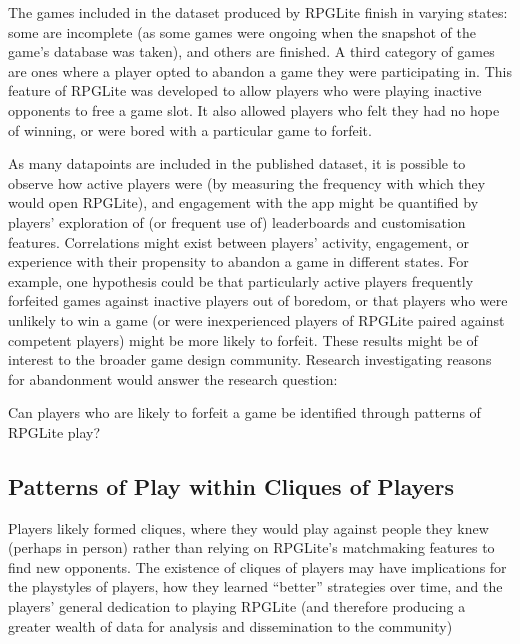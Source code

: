 The games included in the dataset produced by RPGLite finish in varying states:
some are incomplete (as some games were ongoing when the snapshot of the game's
database was taken), and others are finished. A third category of games are ones
where a player opted to abandon a game they were participating in. This feature
of RPGLite was developed to allow players who were playing inactive opponents to
free a game slot. It also allowed players who felt they had no hope of winning,
or were bored with a particular game to forfeit.

As many datapoints are included in the published dataset, it is possible to
observe how active players were (by measuring the frequency with which they
would open RPGLite), and engagement with the app might be quantified by players'
exploration of (or frequent use of) leaderboards and customisation features.
Correlations might exist between players' activity, engagement, or experience
with their propensity to abandon a game in different states. For example, one
hypothesis could be that particularly active players frequently forfeited games
against inactive players out of boredom, or that players who were unlikely to
win a game (or were inexperienced players of RPGLite paired against competent
players) might be more likely to forfeit. These results might be of interest to
the broader game design community. Research investigating reasons for
abandonment would answer the research question:

\begin{researchquestion}
    Can players who are likely to forfeit a game be identified through patterns
    of RPGLite play?
\end{researchquestion}
















    
\subsection{Patterns of Play within Cliques of Players}
Players likely formed cliques, where they would play against people they knew
(perhaps in person) rather than relying on RPGLite's matchmaking features to
find new opponents. The existence of cliques of players may have implications
for the playstyles of players, how they learned ``better'' strategies over time,
and the players' general dedication to playing RPGLite (and therefore producing
a greater wealth of data for analysis and dissemination to the community)
    
